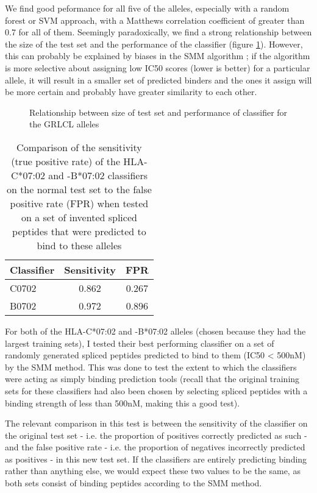 \documentclass[10pt,a4paper,twoside,twocolumn]{article}
\begin{document}
We find good peformance for all five of the alleles, especially with a random forest or SVM approach, with a Matthews correlation coefficient of greater than 0.7 for all of them. Seemingly paradoxically, we find a strong relationship between the size of the test set and the performance of the classifier (figure \ref{scatter}). However, this can probably be explained by biases in the SMM algorithm ; if the algorithm is more selective about assigning low IC50 scores (lower is better) for a particular allele, it will result in a smaller set of predicted binders and the ones it assign will be more certain and probably have greater similarity to each other.

\begin{figure}
	\setlength\figureheight{4cm}
	\setlength{}
	
	\caption{Relationship between size of test set and performance of classifier for the GRLCL alleles}
	\label{scatter}
\end{figure}


\begin{table}
	\centering
	\begin{tabular}{lcc}
		\toprule
		Classifier & Sensitivity & FPR \\ 
		\midrule
		C0702 & 0.862 & 0.267 \\
		B0702 & 0.972 & 0.896 \\
		\bottomrule
	\end{tabular}
	\caption{Comparison of the sensitivity (true positive rate) of the HLA-C*07:02 and -B*07:02 classifiers on the normal test set to the false positive rate (FPR) when tested on a set of invented spliced peptides that were predicted to bind to these alleles}
	\label{invented-binders}
\end{table}

For both of the HLA-C*07:02 and -B*07:02 alleles (chosen because they had the largest training sets), I tested their best performing classifier on a set of randomly generated spliced peptides predicted to bind to them (IC50 < 500nM) by the SMM method. This was done to test the extent to which the classifiers were acting as simply binding prediction tools (recall that the original training sets for these classifiers had also been chosen by selecting spliced peptides with a binding strength of less than 500nM, making this a good test). 

The relevant comparison in this test is between the sensitivity of the classifier on the original test set - i.e. the proportion of positives correctly predicted as such - and the false positive rate  - i.e. the proportion of negatives incorrectly predicted as positives - in this new test set. If the classifiers are entirely predicting binding rather than anything else, we would expect these two values to be the same, as both sets consist of binding peptides according to the SMM method.
\end{document}
